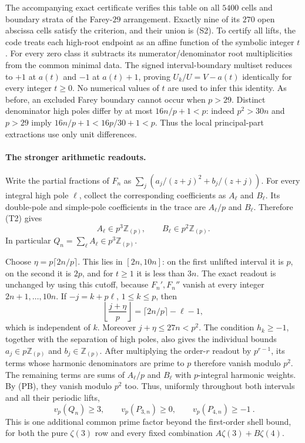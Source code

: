 The accompanying exact certificate verifies this table on all $5400$
cells and boundary strata of the Farey-$29$ arrangement.  Exactly nine
of its $270$ open abscissa cells satisfy the criterion, and their union is
(S2).  To certify all lifts, the code treats each high-root endpoint as
an affine function of the symbolic integer $t$.  For every zero class it
subtracts its numerator/denominator root multiplicities from the common
minimal data.  The signed interval-boundary multiset reduces to $+1$ at
$a(t)$ and $-1$ at $a(t)+1$, proving $U_k/U=V-a(t)$ identically for every
integer $t\ge0$.  No numerical values of $t$ are used to infer this
identity.  As before, an excluded Farey boundary cannot occur when
$p>29$.  Distinct denominator high poles differ by at most $16n/p+1<p$:
indeed $p^2>30n$ and $p>29$ imply
$16n/p+1<16p/30+1<p$.  Thus the local principal-part
extractions use only unit differences.

\paragraph{The stronger arithmetic readouts.}
Write the partial fractions of $F_n$ as
$\sum_j(a_j/(z+j)^2+b_j/(z+j))$.
For every integral high pole $\ell$, collect the corresponding
coefficients as $A_\ell$ and $B_\ell$.  Its double-pole and simple-pole
coefficients in the trace are $A_\ell/p$ and $B_\ell$.  Therefore (T2)
gives
\[
               A_\ell\in p^3\mathbb Z_{(p)},\qquad
               B_\ell\in p^2\mathbb Z_{(p)}.           \tag{PB}
\]
In particular $Q_n=\sum_\ell A_\ell\in p^3\mathbb Z_{(p)}$.

Choose $\eta=p\lceil2n/p\rceil$.  This lies in $[2n,10n]$: on the first
unlifted interval it is $p$, on the second it is $2p$, and for $t\ge1$ it
is less than $3n$.  The exact readout is unchanged by using this cutoff,
because $F_n',F_n''$ vanish at every integer $2n+1,\ldots,10n$.
If $-j=k+p\ell$, $1\le k\le p$, then
\[
 \left\lfloor\frac{j+\eta}{p}\right\rfloor
                 =\lceil2n/p\rceil-\ell-1,
\]
which is independent of $k$.  Moreover $j+\eta\le27n<p^2$.
The condition $h_k\ge-1$, together with the separation of high poles,
also gives the individual bounds $a_j\in p\mathbb Z_{(p)}$ and
$b_j\in\mathbb Z_{(p)}$.  After multiplying the order-$r$ readout by
$p^{r-1}$, its terms whose harmonic denominators are prime to $p$
therefore vanish modulo $p^2$.
The remaining terms are sums of $A_\ell/p$ and $B_\ell$ with
$p$-integral harmonic weights.  By (PB), they vanish modulo $p^2$ too.
Thus, uniformly throughout both intervals and all their periodic lifts,
\[
 \boxed{\ v_p(Q_n)\ge3,\qquad v_p(P_{3,n})\ge0,\qquad
                              v_p(P_{4,n})\ge-1\ }.    \tag{SG}
\]
This is one additional common prime factor beyond the first-order shell
bound, for both the pure $\zeta(3)$ row and every fixed combination
$A\zeta(3)+B\zeta(4)$.
